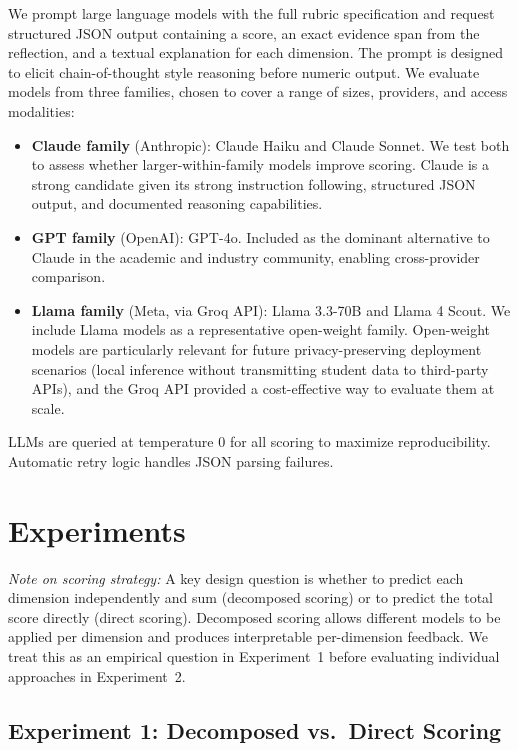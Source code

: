 \documentclass[11pt]{article}
\begin{document}
We prompt large language models with the full rubric specification and request structured JSON output containing a score, an exact evidence span from the reflection, and a textual explanation for each dimension. The prompt is designed to elicit chain-of-thought style reasoning before numeric output. We evaluate models from three families, chosen to cover a range of sizes, providers, and access modalities:

\begin{itemize}
    \item \textbf{Claude family} (Anthropic): Claude Haiku and Claude Sonnet. We test both to assess whether larger-within-family models improve scoring. Claude is a strong candidate given its strong instruction following, structured JSON output, and documented reasoning capabilities.
    \item \textbf{GPT family} (OpenAI): GPT-4o. Included as the dominant alternative to Claude in the academic and industry community, enabling cross-provider comparison.
    \item \textbf{Llama family} (Meta, via Groq API): Llama 3.3-70B and Llama 4 Scout. We include Llama models as a representative open-weight family. Open-weight models are particularly relevant for future privacy-preserving deployment scenarios (local inference without transmitting student data to third-party APIs), and the Groq API provided a cost-effective way to evaluate them at scale.
\end{itemize}

LLMs are queried at temperature 0 for all scoring to maximize reproducibility. Automatic retry logic handles JSON parsing failures.

\section{Experiments}

\noindent\textit{Note on scoring strategy:} A key design question is whether to predict each dimension independently and sum (decomposed scoring) or to predict the total score directly (direct scoring). Decomposed scoring allows different models to be applied per dimension and produces interpretable per-dimension feedback. We treat this as an empirical question in Experiment~1 before evaluating individual approaches in Experiment~2.

\subsection{Experiment 1: Decomposed vs.\ Direct Scoring}
\end{document}
